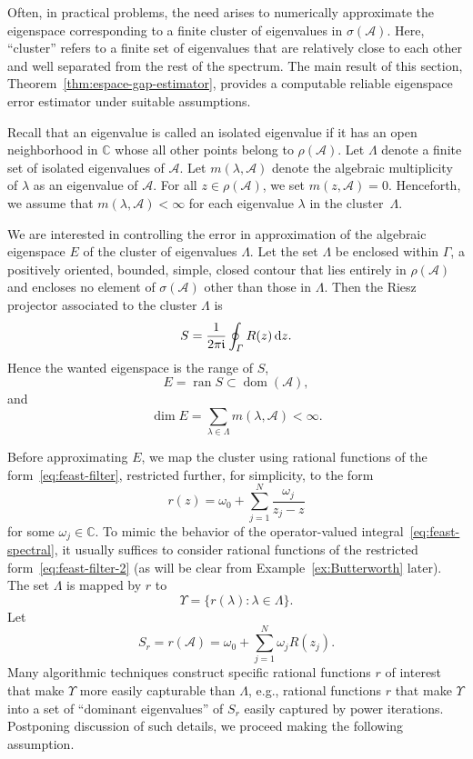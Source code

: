 \documentclass[12pt, oneside, reqno]{amsart}
\theoremstyle{remark}
\newcommand{\ii}{\mathfrak{i}}
\newcommand{\diff}{\mathop{}\!\mathrm{d}}
\DeclareMathOperator{\ran}{ran}
\DeclareMathOperator{\dom}{dom}
\newcommand{\CC}{\mathbb{C}}
\DeclarePairedDelimiter{\parens}{(}{)}
\newcommand{\nquad}{N}
\newcommand{\vL}{\varLambda}
\newcommand{\vU}{\varUpsilon}
\newcommand{\vG}{\varGamma}
\newcommand{\Ac}{\mathcal{A}}
\newcommand{\og}{\omega}
\begin{document}
Often, in practical problems, the need arises to numerically
approximate the eigenspace corresponding to a finite cluster of
eigenvalues in $\sigma(\Ac)$.
Here, ``cluster''  refers to a finite set of eigenvalues that are
relatively close to each other and well separated from the rest of
the spectrum.
The main result of this section, Theorem~\ref{thm:espace-gap-estimator}, provides a computable reliable eigenspace error estimator  under suitable assumptions.

Recall that  an eigenvalue is called an
isolated eigenvalue if it has an open neighborhood in $\CC$ whose all
other points belong to $\rho(\Ac)$.  Let $\vL$ denote a finite set of
isolated eigenvalues of $\Ac$.
Let $m(\lambda, \Ac)$ denote the
algebraic multiplicity of $\lambda$ as an eigenvalue of
$\Ac$. For all  $z \in \rho(\Ac)$, we set 
$m(z, \Ac)=0$.
Henceforth, we assume that $m(\lambda, \Ac) < \infty$ for each
eigenvalue $\lambda$ in the cluster~$\vL$.


We are interested in controlling the error in approximation of the
algebraic eigenspace  $E$ of the cluster of eigenvalues
$\vL$.  Let the set $\vL$ be enclosed within $\vG$, a positively
oriented, bounded, simple, closed contour that lies entirely in
$\rho(\Ac)$ and encloses no element of $\sigma(\Ac)$ other than those in $\vL$.
Then the Riesz projector associated to the cluster $\vL$ is
\begin{equation}
  S = \frac{1}{2\pi \ii} \oint_\vG
  R \parens{z} \diff{z}.
  \label{eq:feast-spectral}
\end{equation}
Hence the wanted eigenspace is the range of $S$, 
\[
  E = \ran S \subset \dom (\Ac),
\]
and 
\[
  \dim E = \sum_{\lambda \in \vL} m(\lambda, \Ac) < \infty.
\]

Before approximating $E$, we map the cluster using rational functions of the
form~\eqref{eq:feast-filter}, restricted further, for simplicity, to the form
\begin{equation}
    r(z) =  \og_0 +  \sum_{j=1}^\nquad 
    \frac{\omega_{j}}{z_j - z}
    \label{eq:feast-filter-2}
\end{equation}
for some $\og_j \in \CC$. To mimic the behavior of the operator-valued
integral~\eqref{eq:feast-spectral}, it usually suffices to consider
rational functions of the restricted form~\eqref{eq:feast-filter-2}
(as will be clear from Example~\ref{ex:Butterworth} later).
The set $\vL$ is mapped by $r$ to 
\begin{equation}
  \label{eq:mapped-ews}
  \vU = \{ r(\lambda): \lambda \in \vL\}.
\end{equation}
Let
\begin{equation}
\label{eq:Sr-defn}
  S_r = r(\Ac) = \og_0 + \sum_{j=1}^\nquad \omega_j R(z_j).
\end{equation}
Many algorithmic techniques construct specific rational functions $r$
of interest that make $\vU$ more easily capturable than $\vL$, e.g.,
rational functions $r$ that make $\vU$ into a set of ``dominant
eigenvalues'' of $S_r$ easily captured by power iterations.
Postponing discussion of such details,
we proceed making the following assumption.
\end{document}
